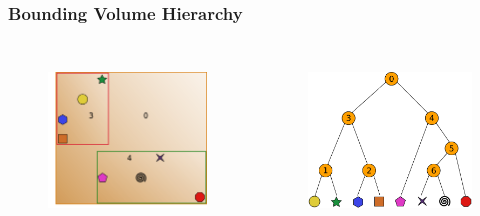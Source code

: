 \documentclass{beamer}
\begin{document}
\begin{frame}
  \frametitle{Bounding Volume Hierarchy}
  
\begin{columns}[t]

\begin{figure}
\includegraphics[height=45mm]{build1.png}
\end{figure}

\begin{figure}
\includegraphics[height=45mm]{primitive_tree_narrow.png}
\end{figure}
\end{columns}
\end{frame}
\end{document}
